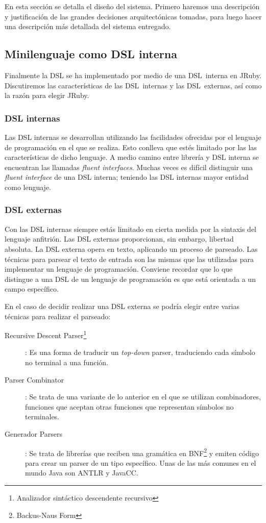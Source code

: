 En esta sección se detalla el diseño del sistema. Primero haremos una
descripción y justificación de las grandes decisiones arquitectónicas
tomadas, para luego hacer una descripción más detallada del sistema
entregado.

\subsection{Minilenguaje como DSL interna}
Finalmente la DSL se ha implementado por medio de una DSL~interna en
JRuby. Discutiremos las características de las DSL~internas y las
DSL~externas, así como la razón para elegir JRuby.
\subsubsection{DSL internas}

Las DSL internas se desarrollan utilizando las facilidades ofrecidas
por el lenguaje de programación en el que se realiza. Esto conlleva que
estés limitado por las las características de dicho lenguaje. A medio
camino entre librería y DSL interna se encuentran las llamadas
\emph{fluent interfaces}. Muchas veces es difícil distinguir una
\emph{fluent interface} de una DSL interna; teniendo las DSL internas
mayor entidad como lenguaje.

\subsubsection{DSL externas}

Con las DSL internas siempre estás limitado en cierta medida por la
sintaxis del lenguaje anfitrión. Las DSL externas proporcionan, sin
embargo, libertad absoluta. La DSL externa opera en texto, aplicando
un proceso de parseado. Las técnicas para parsear el texto de entrada
son las mismas que las utilizadas para implementar un lenguaje de
programación. Conviene recordar que lo que distingue a una DSL de un
lenguaje de programación es que está orientada a un campo específico.

En el caso de decidir realizar una DSL externa se podría elegir entre
varias técnicas para realizar el parseado:
\begin{description}
\item[Recursive Descent Parser\footnote{Analizador sintáctico
    descendente recursivo}]: Es una forma de traducir un
  \emph{top-down} parser, traduciendo cada símbolo no terminal a una
  función.
\item[Parser Combinator]: Se trata de una variante de lo anterior en
  el que se utilizan combinadores, funciones que aceptan otras
  funciones que representan símbolos no terminales.
\item[Generador Parsers]: Se trata de librerías que reciben una
  gramática en BNF\footnote{Backus-Naus Form} y emiten código para
  crear un parser de un tipo específico. Unas de las más comunes en
  el mundo Java son ANTLR y JavaCC.
\end{description}

